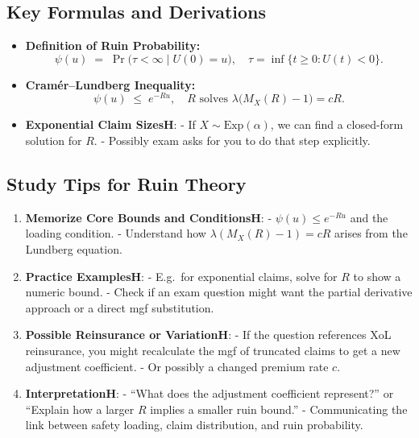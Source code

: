 \documentclass[13pt,a4paper]{article}
\begin{document}
\subsection{Key Formulas and Derivations}
\begin{itemize}
  \item \textbf{Definition of Ruin Probability:}
    \[
      \psi(u) \;=\; \Pr\bigl(\tau<\infty \mid U(0)=u\bigr),
      \quad \tau=\inf\{t\ge 0: U(t)<0\}.
    \]
  \item \textbf{Cramér--Lundberg Inequality:}
    \[
      \psi(u)\;\le\;e^{-Ru},
      \quad R \text{ solves } \lambda \bigl(M_X(R)-1\bigr) = cR.
    \]
  \item \textbf{Exponential Claim SizesH}:
    - If \(X \sim \mathrm{Exp}(\alpha)\), we can find a closed-form solution for \(R\).  
    - Possibly exam asks for you to do that step explicitly.
\end{itemize}

\subsection{Study Tips for Ruin Theory}
\begin{enumerate}
  \item \textbf{Memorize Core Bounds and ConditionsH}:  
    - \(\psi(u)\le e^{-Ru}\) and the loading condition.  
    - Understand how \(\lambda(M_X(R)-1)=cR\) arises from the Lundberg equation.
  \item \textbf{Practice ExamplesH}:  
    - E.g.\ for exponential claims, solve for \(R\) to show a numeric bound.  
    - Check if an exam question might want the partial derivative approach or a direct mgf substitution.
  \item \textbf{Possible Reinsurance or VariationH}:  
    - If the question references XoL reinsurance, you might recalculate the mgf of truncated claims to get a new adjustment coefficient.  
    - Or possibly a changed premium rate \(c\).
  \item \textbf{InterpretationH}:  
    - “What does the adjustment coefficient represent?” or “Explain how a larger \(R\) implies a smaller ruin bound.”  
    - Communicating the link between safety loading, claim distribution, and ruin probability.
\end{enumerate}
\end{document}
